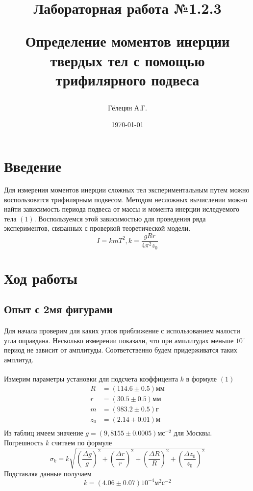 \documentclass[a4paper, 12pt]{article}
\title{\begin{center}Лабораторная работа №1.2.3\end{center}
Определение моментов инерции твердых тел с помощью трифилярного подвеса}
\author{Гёлецян А.Г.}
\date{\today}
\begin{document}
    \maketitle
    \newpage

    \section{Введение}
    Для измерения моментов инерции сложных тел экспериментальным путем можно воспользоватся
    трифилярным подвесом. Методом несложных вычислении можно найти зависимость периода подвеса от массы и момента инерции иследуемого тела $(1)$. Воспользуемся этой зависимостью для проведения ряда экспериментов, связанных с проверкой теоретической модели.
    \begin{equation}
    I=kmT^2,k=\frac{gRr}{4\pi^2z_0}
    \end{equation}

    \section{Ход работы}
    \subsection{Опыт с 2мя фигурами}

    \paragraph{}
    Для начала проверим для каких углов приближение с использованием малости угла оправдана.
    Несколько измерении показали, что при амплитудах меньше $10^\circ$ период не зависит от
    амплитуды. Соответственно будем придерживатся таких амплитуд.
    \paragraph{}
    Измерим параметры установки для подсчета коэффицента $k$ в формуле $(1)$
    \begin{align*}
        R &= (114.6 \pm 0.5) мм\\
        r &= (30.5 \pm 0.5) мм\\
        m &= (983.2 \pm 0.5) г\\
        z_0 &= (2.14 \pm 0.01) м\\
    \end{align*}
    Из таблиц имеем значение $g=(9,8155 \pm 0.0005)мс^{-2}$ для Москвы. Погрешность $k$ считаем по формуле
    \[\sigma_k=k\sqrt{\left(\frac{\Delta g}{g}\right)^2 +
                     \left(\frac{\Delta r}{r}\right)^2 +
                     \left(\frac{\Delta R}{R}\right)^2 +
                     \left(\frac{\Delta z_0}{z_0}\right)^2}\]
    Подставляя данные получаем
    \[k=(4.06\pm0.07) 10^{-4} м^2с^{-2}\]
\end{document}
